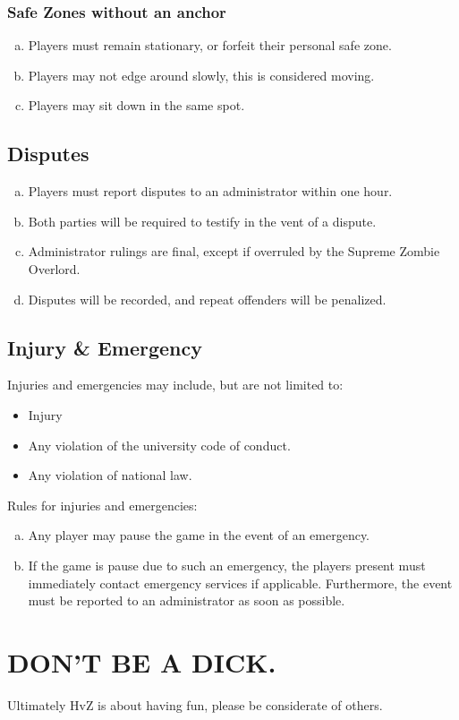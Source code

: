 \documentclass[a4paper,12pt]{article}
\begin{document}
\subsubsection{Safe Zones without an anchor}
\begin{enumerate}[(a)]
    \item Players must remain stationary, or forfeit their personal safe zone.
    \item Players may not edge around slowly, this is considered moving.
    \item Players may sit down in the same spot.
\end{enumerate}

\subsection{Disputes}
\begin{enumerate}[(a)]
    \item Players must report disputes to an administrator within one hour.
    \item Both parties will be required to testify in the vent of a dispute.
    \item Administrator rulings are final, except if overruled by the Supreme Zombie Overlord.
    \item Disputes will be recorded, and repeat offenders will be penalized. 
\end{enumerate}


\subsection{Injury \& Emergency}

Injuries and emergencies may include, but are not limited to:
\begin{itemize}
    \item Injury
    \item Any violation of the university code of conduct.
    \item Any violation of national law. 
\end{itemize}

Rules for injuries and emergencies:
\begin{enumerate}[(a)]
    \item Any player may pause the game in the event of an emergency.
    \item If the game is pause due to such an emergency, the players present must immediately contact emergency services if applicable. Furthermore, the event must be reported to an administrator as soon as possible.
\end{enumerate}

\section{DON'T BE A DICK.}
\label{dbad}
Ultimately HvZ is about having fun, please be considerate of others.



\end{document}
